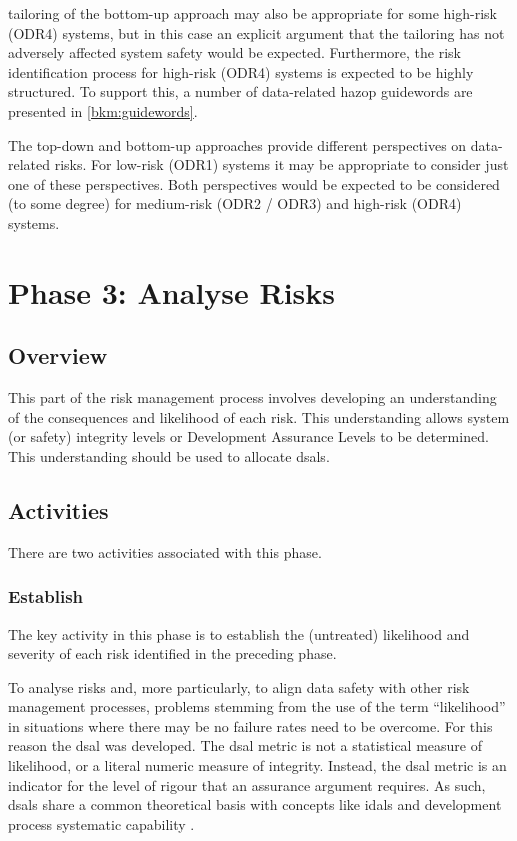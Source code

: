 \Gls{tailoring} of the bottom-up approach may also be appropriate for some high-risk (ODR4) systems, but in this case an explicit argument that the \gls{tailoring} has not adversely affected system safety would be expected. Furthermore, the risk identification process for high-risk (ODR4) systems is expected to be highly structured. To support this, a number of data-related \gls{hazop} guidewords are presented in \autoref{bkm:guidewords}.

The top-down and bottom-up approaches provide different perspectives on data-related risks. For low-risk (ODR1) systems it may be appropriate to consider just one of these perspectives. Both perspectives would be expected to be considered (to some degree) for medium-risk (ODR2 / ODR3) and high-risk (ODR4) systems.

\section{Phase 3: Analyse Risks}
\subsection{Overview}
This part of the risk management process involves developing an understanding of the consequences and likelihood of each risk. This understanding allows system (or safety) \gls{integrity} levels or Development Assurance Levels to be determined. This understanding should be used to allocate
\glspl{dsal}.
%
%
\subsection{Activities}
There are two activities associated with this phase.
%
\subsubsection{Establish }
\label{bkm:DSAL-table-section}
The key activity in this phase is to establish the (untreated) likelihood and severity of each risk identified in the preceding phase.

To analyse risks and, more particularly, to align data safety with other risk management processes, problems stemming from the use of the term ``likelihood'' in situations where there may be no failure rates need to be overcome. For this reason the \gls{dsal} was developed. The \gls{dsal} metric is not a statistical measure of likelihood, or a literal numeric measure of \gls{integrity}. Instead, the \gls{dsal} metric is an indicator for the level of rigour that an assurance argument requires. As such, \glspl{dsal} share a common theoretical basis with concepts like \glspl{idal}  \cite{citation:arp4754a2010guidelines} and development process systematic capability \cite{citation:iec615083}.

